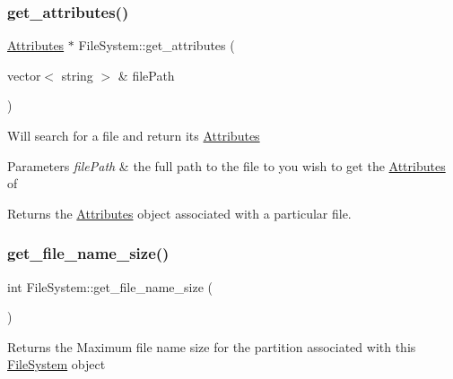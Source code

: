 \subsubsection{\texorpdfstring{get\+\_\+attributes()}{get\_attributes()}}
{\footnotesize\ttfamily \mbox{\hyperlink{class_attributes}{Attributes}} $\ast$ File\+System\+::get\+\_\+attributes (\begin{DoxyParamCaption}\item[{vector$<$ string $>$ \&}]{file\+Path }\end{DoxyParamCaption})}

Will search for a file and return its \mbox{\hyperlink{class_attributes}{Attributes}} 
\begin{DoxyParams}{Parameters}
{\em file\+Path} & the full path to the file to you wish to get the \mbox{\hyperlink{class_attributes}{Attributes}} of \\
\hline
\end{DoxyParams}
\begin{DoxyReturn}{Returns}
the \mbox{\hyperlink{class_attributes}{Attributes}} object associated with a particular file. 
\end{DoxyReturn}
\mbox{\label{class_file_system_a0444400c1e30b7981123ba6991798c86}} 
\subsubsection{\texorpdfstring{get\+\_\+file\+\_\+name\+\_\+size()}{get\_file\_name\_size()}}
{\footnotesize\ttfamily int File\+System\+::get\+\_\+file\+\_\+name\+\_\+size (\begin{DoxyParamCaption}{ }\end{DoxyParamCaption})}

\begin{DoxyReturn}{Returns}
the Maximum file name size for the partition associated with this \mbox{\hyperlink{class_file_system}{File\+System}} object 
\end{DoxyReturn}
\mbox{\label{class_file_system_a469bd9046725f51c7466a21945e4d4f8}} 
